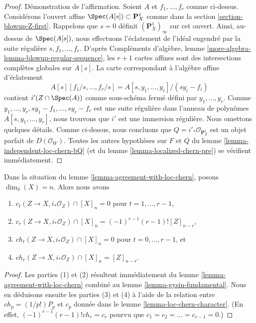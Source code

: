 \begin{proof}
\medskip\noindent
Démonstration de l'affirmation. Soient $A$ et $f_1, \ldots, f_r$ comme ci-dessus.
Considérons l'ouvert affine $\Spec(A[s]) \subset \mathbf{P}^1_X$
comme dans la section \ref{section-blowup-Z-first}. Rappelons que $s = 0$
définit $(\mathbf{P}^1_X)_\infty$ sur cet ouvert. Ainsi, au-dessus de
$\Spec(A[s])$, nous effectuons l'éclatement de l'idéal engendré par
la suite régulière $s, f_1, \ldots, f_r$. D'après Compléments d'algèbre, lemme
\ref{more-algebra-lemma-blowup-regular-sequence}, les $r + 1$
cartes affines sont des intersections complètes globales sur $A[s]$.
La carte correspondant à l'algèbre affine d'éclatement
$$
A[s][f_1/s, \ldots, f_r/s] = A[s, y_1, \ldots, y_r]/(sy_i - f_i)
$$
contient $i'(Z \cap \Spec(A))$ comme sous-schéma fermé défini par
$y_1, \ldots, y_r$. Comme $y_1, \ldots, y_r, sy_1 - f_1, \ldots, sy_r - f_r$
est une suite régulière dans l'anneau de polynômes $A[s, y_1, \ldots, y_r]$,
nous trouvons que $i'$ est une immersion régulière. Nous omettons quelques détails.
Comme ci-dessus, nous concluons que $Q = i'_*\mathcal{O}_{\mathbf{P}^1_Z}$
est un objet parfait de $D(\mathcal{O}_W)$. Toutes les
autres hypothèses sur $F$ et $Q$ du lemme \ref{lemma-independent-loc-chern-bQ}
(et du lemme \ref{lemma-localized-chern-pre}) se vérifient immédiatement.
\end{proof}

\begin{lemma}
\label{lemma-actual-computation}
Dans la situation du lemme \ref{lemma-agreement-with-loc-chern},
posons $\dim_\delta(X) = n$. Alors nous avons
\begin{enumerate}
\item $c_t(Z \to X, i_*\mathcal{O}_Z) \cap [X]_n = 0$ pour
$t = 1, \ldots, r - 1$,
\item $c_r(Z \to X, i_*\mathcal{O}_Z) \cap [X]_n =
(-1)^{r - 1}(r - 1)![Z]_{n - r}$,
\item $ch_t(Z \to X, i_*\mathcal{O}_Z) \cap [X]_n = 0$ pour
$t = 0, \ldots, r - 1$, et
\item $ch_r(Z \to X, i_*\mathcal{O}_Z) \cap [X]_n = [Z]_{n - r}$.
\end{enumerate}
\end{lemma}

\begin{proof}
Les parties (1) et (2) résultent immédiatement du
lemme \ref{lemma-agreement-with-loc-chern}
combiné au lemme \ref{lemma-gysin-fundamental}.
Nous en déduisons ensuite les parties (3) et (4) à l'aide de la relation
entre $ch_p = (1/p!)P_p$ et $c_p$ donnée dans le
lemme \ref{lemma-loc-chern-character}. (En effet,
$(-1)^{r - 1}(r - 1)!ch_r = c_r$ pourvu que
$c_1 = c_2 = \ldots = c_{r - 1} = 0$.)
\end{proof}







